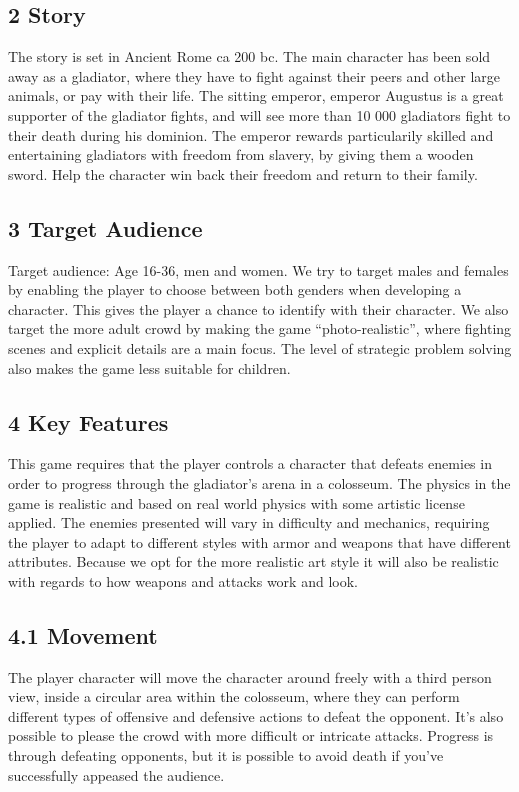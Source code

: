 \documentclass{article}
\begin{document}
\begin{titlepage}
\subsection{ 2 Story }
The story is set in Ancient Rome ca 200 bc. The main character has been sold away as a gladiator, where they have to fight against their peers and other large animals, or pay with their life. The sitting emperor, emperor Augustus is a great supporter of the gladiator fights, and will  see more than 10 000 gladiators fight to their death during his dominion. The emperor rewards particularily skilled and entertaining gladiators with freedom from slavery, by giving them a  wooden sword. Help the character win back their freedom and return to their family.

\subsection{ 3 Target Audience }
Target audience: Age 16-36, men and women. We try to target males and females by enabling the player to choose between both genders when developing a character. This gives the player a chance to identify with their character. We also target the more adult crowd by making the game “photo-realistic”, where fighting scenes and explicit details are a main focus. The level of strategic problem solving also makes the game less suitable for children.

\subsection{ 4 Key Features }
This game requires that the player controls a character that defeats enemies in order to progress through the gladiator’s arena in a colosseum. The physics in the game is realistic and based on real world physics with some artistic license applied. The enemies presented will vary in difficulty and mechanics, requiring the player to adapt to different styles with armor and weapons that have different attributes. Because we opt for the more realistic art style it will also be realistic with regards to how weapons and attacks work and look.

\subsection{ 4.1 Movement }
The player character will move the character around freely with a third person view, inside a circular area within the colosseum, where they can perform different types of offensive and defensive actions to defeat the opponent. It’s also possible to please the crowd with more difficult or intricate attacks. Progress is through defeating opponents, but it is possible to avoid death if you’ve successfully appeased the audience.


\end{titlepage}
\end{document}

